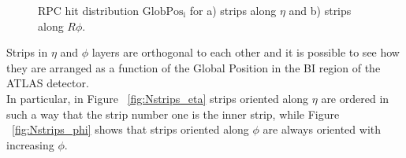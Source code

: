 \begin{figure}[!h]
	\centering	
	\caption{RPC hit distribution $\mathrm{GlobPos_{i}}$ for a) strips along $\eta$ and b) strips along $R\phi$.}
	\label{fig:strips}
\end{figure}	
Strips in $\eta$ and $\phi$ layers are orthogonal to each other and it is possible to see how 
they are arranged as a function of the Global Position in the BI region of the ATLAS detector.\\
In particular, in Figure ~\ref{fig:Nstrips_eta} strips oriented along $\eta$ are ordered in such a 
way that the strip number one is the inner strip, while Figure ~\ref{fig:Nstrips_phi} shows that 
strips oriented along $\phi$ are always oriented with increasing $\phi$. 
